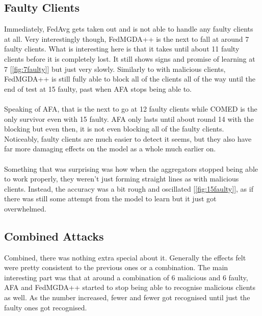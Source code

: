 \subsection{Faulty Clients}
Immediately, FedAvg gets taken out and is not able to handle any faulty clients at all.
Very interestingly though, FedMGDA++ is the next to fall at around 7 faulty clients.
What is interesting here is that it takes until about 11 faulty clients before it is completely lost.
It still shows signs and promise of learning at 7 [\ref{fig:7faulty}] but just very slowly.
Similarly to with malicious clients, FedMGDA++ is still fully able to block all of the clients all of the way until the end of test at 15 faulty, past when AFA stops being able to.
\\ \\
Speaking of AFA, that is the next to go at 12 faulty clients while COMED is the only survivor even with 15 faulty.
AFA only lasts until about round 14 with the blocking but even then, it is not even blocking all of the faulty clients.
Noticeably, faulty clients are much easier to detect it seems, but they also have far more damaging effects on the model as a whole much earlier on.
\\ \\
Something that was surprising was how when the aggregators stopped being able to work properly, they weren't just forming straight lines as with malicious clients.
Instead, the accuracy was a bit rough and oscillated [\ref{fig:15faulty}], as if there was still some attempt from the model to learn but it just got overwhelmed.


\subsection{Combined Attacks}
Combined, there was nothing extra special about it.
Generally the effects felt were pretty consistent to the previous ones or a combination.
The main interesting part was that at around a combination of 6 malicious and 6 faulty, AFA and FedMGDA++ started to stop being able to recognise malicious clients as well.
As the number increased, fewer and fewer got recognised until just the faulty ones got recognised.

